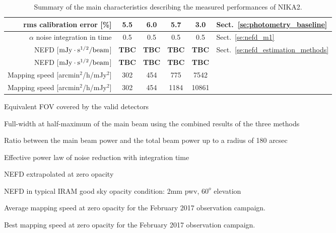 \begin{table}[h]
\begin{center}
\begin{threeparttable}
\begin{tabular}{|r|c|c|c|c|l|}
      \hline
      rms calibration error [\%]                 &    5.5       &     6.0       &      5.7       &     3.0       & Sect.~\ref{se:photometry_baseline} \\
      \hline
      $\alpha$ noise integration in time\tnote{d}\hspace{1mm}  & 0.5  & 0.5  &  0.5 & 0.5 & Sect.~\ref{se:nefd_m1} \\
      \hline
      NEFD\tnote{e}\hspace{1mm}   [$\rm{mJy} \cdot \rm{s}^{1/2}/\rm{beam}$]  &  {\bf TBC}  & {\bf TBC} &  {\bf TBC}  & {\bf TBC} & Sect.~\ref{se:nefd_estimation_methods}\\
      NEFD\tnote{f}\hspace{1mm}   [$\rm{mJy} \cdot \rm{s}^{1/2}/\rm{beam}$]  &  {\bf TBC}  & {\bf TBC} &  {\bf TBC}  & {\bf TBC} & \\
      Mapping speed\tnote{g}\hspace{1mm} [arcmin$^2$/h/mJy$^2$] & 302  & 454  & 775  & 7542 &  \\
      Mapping speed\tnote{h}\hspace{1mm} [arcmin$^2$/h/mJy$^2$] & 302  & 454  & 1184 & 10861 & \\
\hline

\end{tabular}
  \begin{tablenotes}
{\small     
  \item[(a)] Equivalent FOV covered by the valid detectors
  \item[(b)] Full-width at half-maximum of the main beam using the combined results of the three methods
  \item[(c)] Ratio between the main beam power and the total beam power up to a radius of 180 arcsec
  \item[(d)] Effective power law of noise reduction with integration time
  \item[(e)] NEFD extrapolated at zero opacity
  \item[(f)] NEFD in typical IRAM good sky opacity condition: 2mm pwv, $60^o$ elevation
  \item[(g)] Average mapping speed at zero opacity for the February 2017 observation campaign.
  \item[(h)] Best mapping speed at zero opacity for the February 2017 observation campaign.
}
  \end{tablenotes}
\end{threeparttable}
\caption[Main performance measurements]{Summary of the main characteristics describing the measured 
performances of NIKA2.}
\label{tab:nika2summary}
\end{center}  
\end{table}


